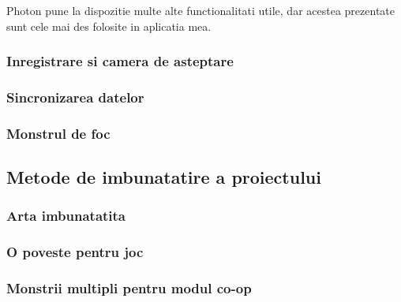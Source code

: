 \documentclass[12pt, a4paper]{article}
\begin{document}
	Photon pune la dispozitie multe alte functionalitati utile, dar acestea prezentate sunt cele mai des folosite in aplicatia mea.
	
	
	
	
	
	\subsubsection{Inregistrare si camera de asteptare}
	
	
	
	
	
	\subsubsection{Sincronizarea datelor}
	\label{section: dataSync}
	
	
	
	
	
	\subsubsection{Monstrul de foc}
	
	
	
	
	
	\subsection{Metode de imbunatatire a proiectului}
	
	
	
	
	
	\subsubsection{Arta imbunatatita}
	
	
	
	
	
	\subsubsection{O poveste pentru joc}
	
	
	
	
	
	\subsubsection{Monstrii multipli pentru modul co-op}
	
	
	
	
	
\end{document}
